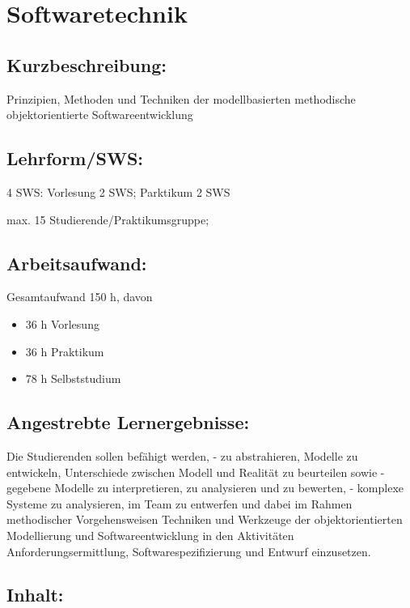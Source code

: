 \chapter{Softwaretechnik}\label{softwaretechnik}

\section{Kurzbeschreibung:}\label{kurzbeschreibung-4}

Prinzipien, Methoden und Techniken der modellbasierten methodische
objektorientierte Softwareentwicklung

\section{Lehrform/SWS:}\label{lehrformsws-26}

4 SWS: Vorlesung 2 SWS; Parktikum 2 SWS

max. 15 Studierende/Praktikumsgruppe;

\section{Arbeitsaufwand:}\label{arbeitsaufwand-25}

Gesamtaufwand 150 h, davon

\begin{itemize}
\tightlist
\item
  36 h Vorlesung
\item
  36 h Praktikum
\item
  78 h Selbststudium
\end{itemize}

\section{Angestrebte
Lernergebnisse:}\label{angestrebte-lernergebnisse-26}

Die Studierenden sollen befähigt werden, - zu abstrahieren, Modelle zu
entwickeln, Unterschiede zwischen Modell und Realität zu beurteilen
sowie - gegebene Modelle zu interpretieren, zu analysieren und zu
bewerten, - komplexe Systeme zu analysieren, im Team zu entwerfen und
dabei im Rahmen methodischer Vorgehensweisen Techniken und Werkzeuge der
objektorientierten Modellierung und Softwareentwicklung in den
Aktivitäten Anforderungsermittlung, Softwarespezifizierung und Entwurf
einzusetzen.

\section{Inhalt:}\label{inhalt-26}

